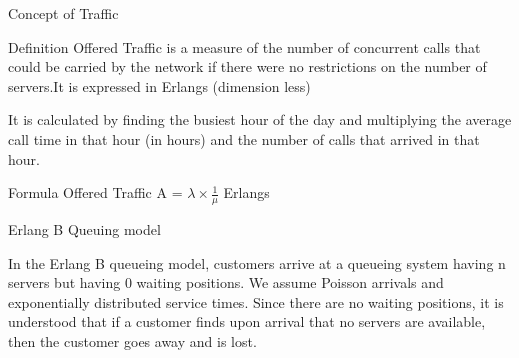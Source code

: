 \documentclass{beamer}
\begin{document}
\begin{frame}{Concept of Traffic}
  \begin{block}{Definition}
    Offered Traffic is a measure of the number of concurrent calls that could be carried by the network if
    there were no restrictions on the number of servers.It is expressed in Erlangs (dimension less)
  \end{block}
  It is calculated by finding the busiest hour of the day and multiplying the average call time in that hour (in hours)
  and the number of calls that arrived in that hour.
  \begin{block}{Formula}
    Offered Traffic A = $\lambda \times \frac{1}{\mu}$ Erlangs
  \end{block}
\end{frame}
\begin{frame}{Erlang B Queuing model}
  \begin{block}{}
    In the Erlang B queueing model, customers arrive at a queueing system having n servers but having 0 waiting positions.
    We assume Poisson arrivals and exponentially distributed service times.
    Since there are no waiting positions, it is understood that if a customer finds upon arrival that
    no servers are available, then the customer goes away and is lost.
  \end{block}
\end{frame}
\end{document}

